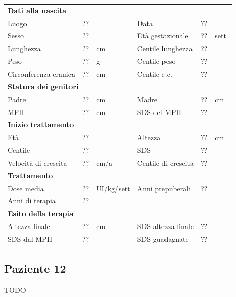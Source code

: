 \begin{table}[!h]
\begin{tabular}{lrllrl}
\toprule
\multicolumn{6}{l}{\textbf{Dati alla nascita}}\\
Luogo 		& \multicolumn{2}{l}{??} 	& Data 					& \multicolumn{2}{l}{??} 	\\
Sesso 		& \multicolumn{2}{l}{??} 	& Età gestazionale 		& ?? 		& sett.\\
Lunghezza 	& ?? 		& cm 				& Centile lunghezza		& ?? 		\\
Peso 		& ?? 		& g					& Centile peso			& ?? 		\\
Circonferenza cranica	& ?? 		& cm 	& Centile c.c.			& ?? \\
\midrule
\multicolumn{6}{l}{\textbf{Statura dei genitori}}\\
Padre 		& ?? & cm 	& Madre 				& ?? & cm \\
MPH 		& ?? & cm 	& SDS del MPH 			& ??\\
\midrule
\multicolumn{6}{l}{\textbf{Inizio trattamento}} \\
Età	& ?? & 		& Altezza 				& ?? & cm  \\
Centile & ?? 	 &		& SDS		& ?? \\
Velocità di crescita & ?? & cm/a	& Centile di crescita & ??\\
\midrule
\multicolumn{6}{l}{\textbf{Trattamento}} \\
Dose media		& ?? & UI/kg/sett & Anni prepuberali & ??\\
Anni di terapia & ??\\
\midrule
\multicolumn{6}{l}{\textbf{Esito della terapia}} \\
Altezza finale			& ?? & cm 	& SDS altezza finale		& ??\\
SDS dal MPH				& ?? &		& SDS guadagnate 			& ??\\
\bottomrule
\end{tabular}
\end{table}
\clearpage


\subsection*{Paziente 12}

TODO


